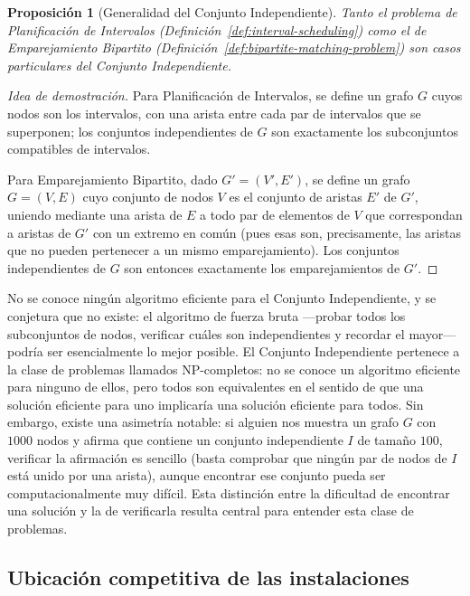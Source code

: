 \documentclass[12pt, spanish, oneside, openany]{book}
\theoremstyle{uprightplain}
\newtheorem{proposicion}[teorema]{Proposición}
\theoremstyle{definition}
\theoremstyle{remark}
\theoremstyle{definition}
\begin{document}
\begin{proposicion}[Generalidad del Conjunto Independiente]
\label{prop:generalidad-is}
Tanto el problema de Planificación de Intervalos (Definición~\ref{def:interval-scheduling}) como el de Emparejamiento Bipartito (Definición~\ref{def:bipartite-matching-problem}) son casos particulares del Conjunto Independiente.
\end{proposicion}
\begin{proof}[Idea de demostración]
Para Planificación de Intervalos, se define un grafo $G$ cuyos nodos son los intervalos, con una arista entre cada par de intervalos que se superponen; los conjuntos independientes de $G$ son exactamente los subconjuntos compatibles de intervalos.

Para Emparejamiento Bipartito, dado $G'=(V',E')$, se define un grafo $G=(V,E)$ cuyo conjunto de nodos $V$ es el conjunto de aristas $E'$ de $G'$, uniendo mediante una arista de $E$ a todo par de elementos de $V$ que correspondan a aristas de $G'$ con un extremo en común (pues esas son, precisamente, las aristas que no pueden pertenecer a un mismo emparejamiento). Los conjuntos independientes de $G$ son entonces exactamente los emparejamientos de $G'$.
\end{proof}

No se conoce ningún algoritmo eficiente para el Conjunto Independiente, y se conjetura que no existe: el algoritmo de fuerza bruta —probar todos los subconjuntos de nodos, verificar cuáles son independientes y recordar el mayor— podría ser esencialmente lo mejor posible. El Conjunto Independiente pertenece a la clase de problemas llamados NP-completos: no se conoce un algoritmo eficiente para ninguno de ellos, pero todos son equivalentes en el sentido de que una solución eficiente para uno implicaría una solución eficiente para todos. Sin embargo, existe una asimetría notable: si alguien nos muestra un grafo $G$ con $1000$ nodos y afirma que contiene un conjunto independiente $I$ de tamaño $100$, verificar la afirmación es sencillo (basta comprobar que ningún par de nodos de $I$ está unido por una arista), aunque encontrar ese conjunto pueda ser computacionalmente muy difícil. Esta distinción entre la dificultad de encontrar una solución y la de verificarla resulta central para entender esta clase de problemas.

\subsection{Ubicación competitiva de las instalaciones}
\label{subsec:facility-location}
\end{document}
